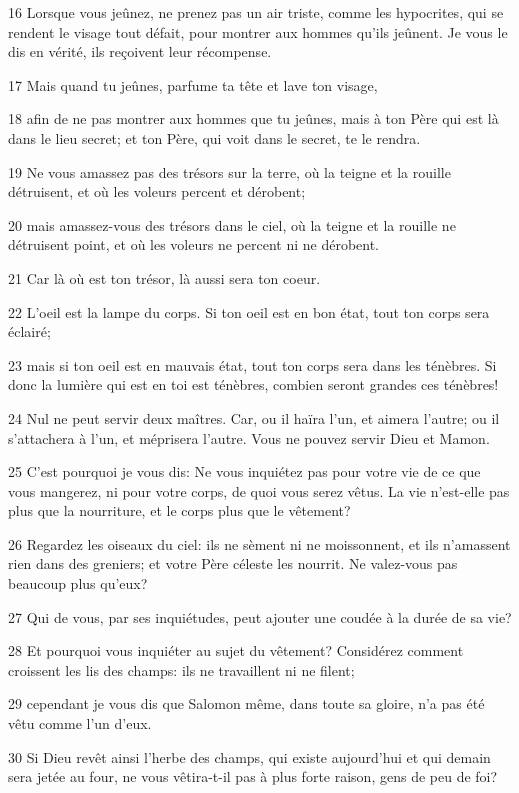 \par 16 Lorsque vous jeûnez, ne prenez pas un air triste, comme les hypocrites, qui se rendent le visage tout défait, pour montrer aux hommes qu'ils jeûnent. Je vous le dis en vérité, ils reçoivent leur récompense.
\par 17 Mais quand tu jeûnes, parfume ta tête et lave ton visage,
\par 18 afin de ne pas montrer aux hommes que tu jeûnes, mais à ton Père qui est là dans le lieu secret; et ton Père, qui voit dans le secret, te le rendra.
\par 19 Ne vous amassez pas des trésors sur la terre, où la teigne et la rouille détruisent, et où les voleurs percent et dérobent;
\par 20 mais amassez-vous des trésors dans le ciel, où la teigne et la rouille ne détruisent point, et où les voleurs ne percent ni ne dérobent.
\par 21 Car là où est ton trésor, là aussi sera ton coeur.
\par 22 L'oeil est la lampe du corps. Si ton oeil est en bon état, tout ton corps sera éclairé;
\par 23 mais si ton oeil est en mauvais état, tout ton corps sera dans les ténèbres. Si donc la lumière qui est en toi est ténèbres, combien seront grandes ces ténèbres!
\par 24 Nul ne peut servir deux maîtres. Car, ou il haïra l'un, et aimera l'autre; ou il s'attachera à l'un, et méprisera l'autre. Vous ne pouvez servir Dieu et Mamon.
\par 25 C'est pourquoi je vous dis: Ne vous inquiétez pas pour votre vie de ce que vous mangerez, ni pour votre corps, de quoi vous serez vêtus. La vie n'est-elle pas plus que la nourriture, et le corps plus que le vêtement?
\par 26 Regardez les oiseaux du ciel: ils ne sèment ni ne moissonnent, et ils n'amassent rien dans des greniers; et votre Père céleste les nourrit. Ne valez-vous pas beaucoup plus qu'eux?
\par 27 Qui de vous, par ses inquiétudes, peut ajouter une coudée à la durée de sa vie?
\par 28 Et pourquoi vous inquiéter au sujet du vêtement? Considérez comment croissent les lis des champs: ils ne travaillent ni ne filent;
\par 29 cependant je vous dis que Salomon même, dans toute sa gloire, n'a pas été vêtu comme l'un d'eux.
\par 30 Si Dieu revêt ainsi l'herbe des champs, qui existe aujourd'hui et qui demain sera jetée au four, ne vous vêtira-t-il pas à plus forte raison, gens de peu de foi?
